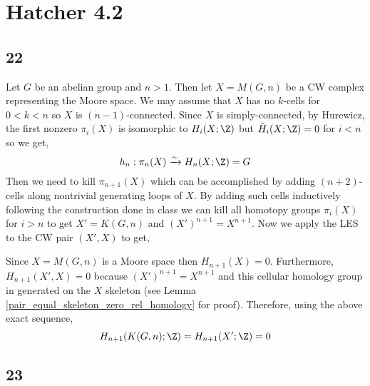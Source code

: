 \documentclass[12pt]{extarticle}
\begin{document}

\section*{Hatcher 4.2}

\subsection{22}

Let $G$ be an abelian group and $n > 1$. Then let $X = M(G, n)$ be a CW complex representing the Moore space. We may assume that $X$ has no $k$-cells for $0 < k < n$ so $X$ is $(n-1)$-connected. Since $X$ is simply-connected, by Hurewicz, the first nonzero $\pi_i(X)$ is isomorphic to $H_i(X; \Z)$ but $\tilde{H}_i(X; \Z) = 0$ for $i < n$ so we get,
\[ h_n : \pi_n(X) \xrightarrow{\sim} H_n(X; \Z) = G \]
Then we need to kill $\pi_{n+1}(X)$ which can be accomplished by adding $(n+2)$-cells along nontrivial generating loops of $X$. By adding such cells inductively following the construction done in class we can kill all homotopy groups $\pi_i(X)$ for $i > n$ to get $X' = K(G, n)$ and $(X')^{n+1} = X^{n+1}$. Now we apply the LES to the CW pair $(X', X)$ to get,
\begin{center}
\end{center} 
Since $X = M(G, n)$ is a Moore space then $H_{n+1}(X) = 0$. Furthermore, $H_{n+1}(X', X) = 0$ because $(X')^{n+1} = X^{n+1}$ and this cellular homology group in generated on the $X$ skeleton (see Lemma \ref{pair_equal_skeleton_zero_rel_homology} for proof). Therefore, using the above exact sequence,
\[ H_{n+1}(K(G, n) ; \Z) = H_{n+1}(X' ; \Z) = 0 \]
\iffalse
Alternatively, we may apply the Hurewicz theorem to $K(G, n)$ as follows. Since $K(G, n)$ is a $(n-1)$-connected CW complex then $h_{n+1} : \pi_{n+1}(K(G, n)) \onto H_{n+1}(K(G, n); \Z)$ but $\pi_{n+1}(K(G, n)) = 0$ so $H_{n+1}(K(G, n); \Z) = 0$. 
\fi
\subsection{23}
\end{document}
